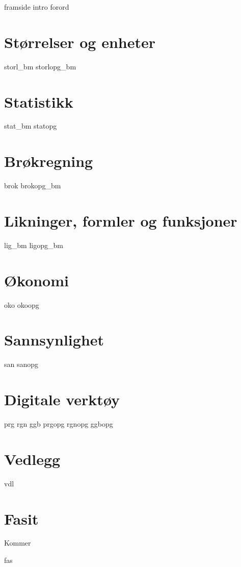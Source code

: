 




{framside}
{intro}
{forord}

\tableofcontents

\chapter{Størrelser og enheter}
\newpage
{storl_bm}
\opgt
{storlopg_bm}

\chapter{Statistikk}
\newpage
{stat_bm}
{statopg}

\chapter{Brøkregning \label{Br}}
\newpage
{brok}
\newpage
{brokopg_bm}

\chapter{Likninger, formler og funksjoner \label{Lig}}
\newpage
{lig_bm}
{ligopg_bm}

\chapter{Økonomi \label{Oko}}
\newpage
{oko}
{okoopg}

\chapter{Sannsynlighet \label{San}} 
\newpage
{san}
{sanopg}

\chapter{Digitale verktøy}
\newpage
{prg}
{rgn}	
{ggb}	
\opgt
{prgopg}
{rgnopg}	
{ggbopg}	

\chapter*{Vedlegg} 
\newpage
{}
{vdl}


\chapter*{Fasit}
Kommer

{fas}






